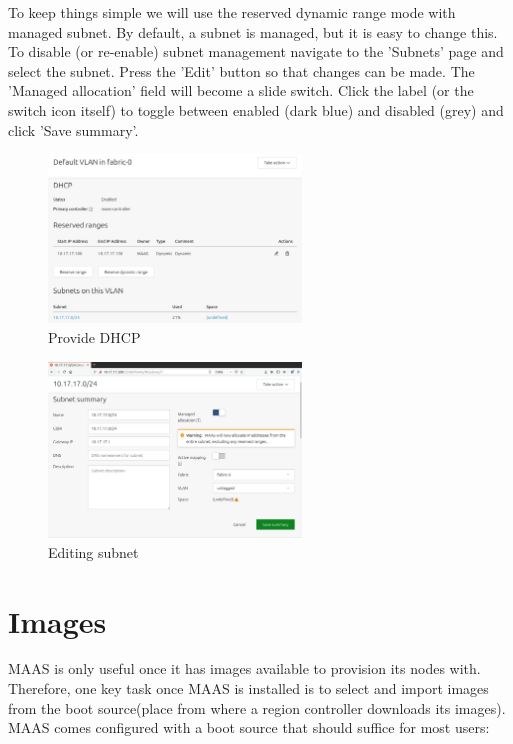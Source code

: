 To keep things simple we will use the reserved dynamic range mode with managed subnet. By default, a subnet is managed, but it is easy to change this. To disable (or re-enable) subnet management navigate to the 'Subnets' page and select the subnet. Press the 'Edit' button so that changes can be made. The 'Managed allocation' field will become a slide switch. Click the label (or the switch icon itself) to toggle between enabled (dark blue) and disabled (grey) and click 'Save summary'.

\begin{figure}[!ht]
    \centering
    \includegraphics[width=0.6\textwidth]{images/4-9.png}
    \caption{Provide DHCP}
\end{figure}

\begin{figure}[!ht]
    \centering
    \includegraphics[width=0.6\textwidth]{images/4-10.png}
    \caption{Editing subnet}
\end{figure}

\section{Images}

MAAS is only useful once it has images available to provision its nodes with. Therefore, one key task once MAAS is installed is to select and import images from the boot source(place from where a region controller downloads its images). MAAS comes configured with a boot source that should suffice for most users:

